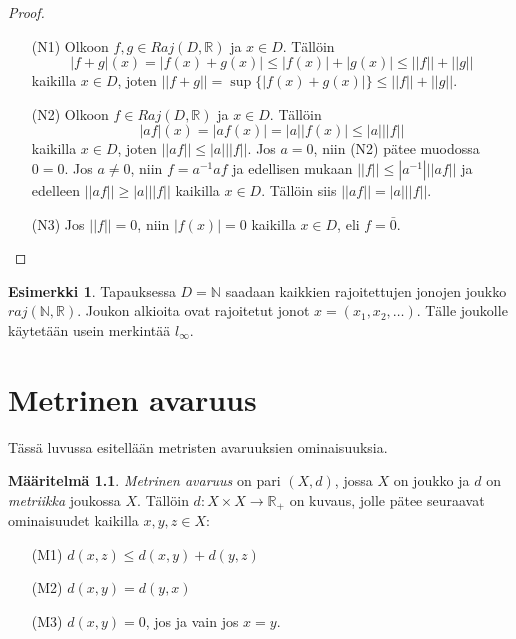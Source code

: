 \documentclass[12pt,a4paper,leqno]{report}
\newcommand{\R}{\mathbb{R}}
\newcommand{\N}{\mathbb{N}}
\theoremstyle{plain}
\theoremstyle{definition}
\newtheorem{maar}[equation]{Määritelmä}
\newtheorem{esim}[equation]{Esimerkki}
\theoremstyle{remark}
\begin{document}
\begin{proof}
\begin{itemize}
\item[(N1)] Olkoon $f,g\in Raj(D,\R )$ ja $x\in D$. Tällöin
\begin{equation*}
|f+g|(x)=|f(x)+g(x)|\leq|f(x)|+|g(x)|\leq||f||+||g||
\end{equation*}
kaikilla $x\in D$, joten $||f+g||=\sup\{|f(x)+g(x)|\}\leq||f||+||g||$.

\item[(N2)] Olkoon $f\in Raj(D,\R )$ ja $x\in D$. Tällöin
\begin{equation*}
|af|(x)=|af(x)|=|a||f(x)|\leq|a|||f||
\end{equation*}
kaikilla $x\in D$, joten $||af||\leq|a|||f||$. Jos $a=0$, niin (N2) pätee muodossa $0=0$. %
Jos $a\neq 0$, niin $f=a^{-1}af$ ja edellisen
mukaan $||f||\leq|a^{-1}|||af||$
ja edelleen $||af||\geq|a|||f||$ kaikilla $x\in D$. Tällöin siis $||af||=|a|||f||$.

\item[(N3)]Jos $||f||=0$, niin $|f(x)|=0$ kaikilla $x\in D$, eli  $f=\bar{0}$.
\end{itemize} 
\end{proof}

\begin{esim}
Tapauksessa $D=\N$ saadaan kaikkien rajoitettujen jonojen joukko $raj(\N,\R).$ Joukon alkioita ovat rajoitetut jonot $x=(x_1,x_2,\dots).$ Tälle joukolle käytetään usein merkintää $l_\infty$.

\end{esim}


\chapter{Metrinen avaruus}\label{metrinen}
Tässä luvussa esitellään metristen avaruuksien ominaisuuksia.
\begin{maar} \emph{Metrinen avaruus} 
on pari $(X,d)$, jossa $X$ on joukko ja $d$ on \emph{metriikka} joukossa $X$.
Tällöin $d\colon X\times X\rightarrow \R_+$ on kuvaus, jolle pätee seuraavat ominaisuudet kaikilla $x,y,z\in X$:
\begin{itemize}
\item[(M1)]$d(x,z)\leq d(x,y)+d(y,z)$
\item[(M2)]$d(x,y)=d(y,x)$
\item[(M3)]$d(x,y)=0$, jos ja vain jos $x=y$.
\end{itemize} 
\end{maar} 
\end{document}
